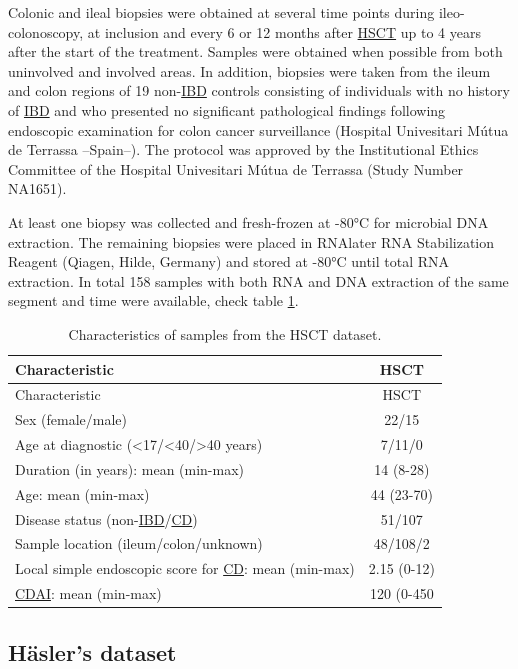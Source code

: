 \documentclass[
  12pt,
  a4paper,
  twoside,
  openright]{book}
\begin{document}
Colonic and ileal biopsies were obtained at several time points during ileo-colonoscopy, at inclusion and every 6 or 12 months after \protect\hyperlink{acronyms_HSCT}{HSCT} up to 4 years after the start of the treatment.
Samples were obtained when possible from both uninvolved and involved areas.
In addition, biopsies were taken from the ileum and colon regions of 19 non-\protect\hyperlink{acronyms_IBD}{IBD} controls consisting of individuals with no history of \protect\hyperlink{acronyms_IBD}{IBD} and who presented no significant pathological findings following endoscopic examination for colon cancer surveillance (Hospital Univesitari Mútua de Terrassa --Spain--).
The protocol was approved by the Institutional Ethics Committee of the Hospital Univesitari Mútua de Terrassa (Study Number NA1651).

At least one biopsy was collected and fresh-frozen at -80°C for microbial DNA extraction.
The remaining biopsies were placed in RNAlater RNA Stabilization Reagent (Qiagen, Hilde, Germany) and stored at -80°C until total RNA extraction.
In total 158 samples with both RNA and DNA extraction of the same segment and time were available, check table \ref{tab:HSCT}.

\begin{longtable}[]{@{}lc@{}}
\caption{\label{tab:HSCT} Characteristics of samples from the HSCT dataset.}\tabularnewline
\toprule
Characteristic & HSCT \\
\midrule
\endfirsthead
\toprule
Characteristic & HSCT \\
\midrule
\endhead
Sex (female/male) & 22/15 \\
Age at diagnostic (\textless17/\textless40/\textgreater40 years) & 7/11/0 \\
Duration (in years): mean (min-max) & 14 (8-28) \\
Age: mean (min-max) & 44 (23-70) \\
Disease status (non-\protect\hyperlink{acronyms_IBD}{IBD}/\protect\hyperlink{acronyms_CD}{CD}) & 51/107 \\
Sample location (ileum/colon/unknown) & 48/108/2 \\
Local simple endoscopic score for \protect\hyperlink{acronyms_CD}{CD}: mean (min-max) & 2.15 (0-12) \\
\protect\hyperlink{acronyms_CDAI}{CDAI}: mean (min-max) & 120 (0-450 \\
\bottomrule
\end{longtable}

\hypertarget{methods-hasler}{%
\subsection{Häsler's dataset}\label{methods-hasler}}
\end{document}
